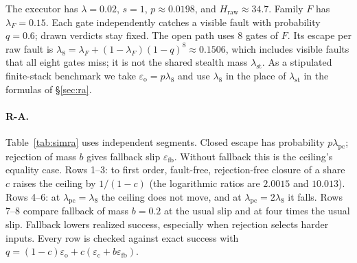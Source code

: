\documentclass[11pt]{article}
\theoremstyle{definition}
\theoremstyle{remark}
\newcommand{\lst}{\lambda_{\mathrm{st}}}
\newcommand{\Hraw}{H_{\mathrm{raw}}}
\newcommand{\lF}{\lambda_F}
\newcommand{\lpc}{\lambda_{\mathrm{pc}}}
\newcommand{\eop}{\varepsilon_{\mathrm{o}}}
\newcommand{\ecl}{\varepsilon_{\mathrm{c}}}
\begin{document}
The executor has $\lambda=0.02$, $s=1$, $p\approx0.0198$, and $\Hraw\approx34.7$.
Family $F$ has $\lF=0.15$.
Each gate independently catches a visible fault with probability $q=0.6$; drawn verdicts stay fixed.
The open path uses $8$ gates of $F$. Its escape per raw fault is
$\lambda_8=\lF+(1-\lF)(1-q)^8\approx0.1506$, which includes visible faults that all eight gates
miss; it is not the shared stealth mass $\lst$. As a stipulated finite-stack benchmark we take
$\eop=p\lambda_8$ and use $\lambda_8$ in the place of $\lst$ in the formulas of \S\ref{sec:ra}.

\paragraph{R-A.}
Table~\ref{tab:simra} uses independent segments.
Closed escape has probability $p\lpc$; rejection of mass $b$ gives fallback slip
$\varepsilon_{\mathrm{fb}}$.
Without fallback this is the ceiling's equality case. Rows 1--3: to first order,
fault-free, rejection-free closure of a share $c$ raises the ceiling by $1/(1-c)$ (the logarithmic ratios are $2.0015$ and
$10.013$). Rows 4--6: at $\lpc=\lambda_8$ the ceiling does not move, and at
$\lpc=2\lambda_8$ it falls. Rows 7--8 compare fallback of mass $b=0.2$ at the usual slip and at
four times the usual slip.
Fallback lowers realized success, especially when rejection selects harder inputs.
Every row is checked against exact success with
$q=(1-c)\eop+c(\ecl+b\varepsilon_{\mathrm{fb}})$.
\end{document}
